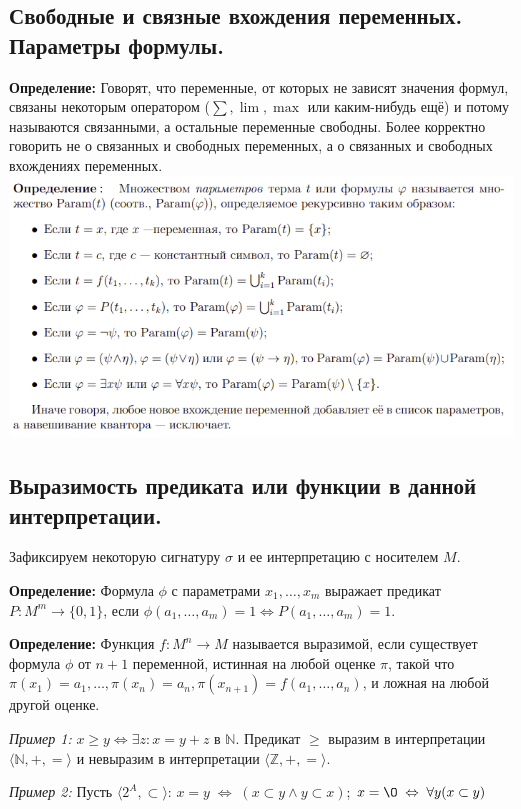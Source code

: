 \subsection{Свободные и связные вхождения переменных. Параметры формулы.}
\textbf{Определение:} Говорят, что переменные, от которых не зависят значения формул, связаны некоторым оператором ($\sum, \lim, \max$ или каким-нибудь ещё) и потому называются связанными, а остальные переменные свободны. Более корректно говорить не о связанных и свободных переменных, а о связанных и свободных вхождениях переменных.
\newline \includegraphics[width=0.9\linewidth]{images/1_definitions_param.png}

\subsection{Выразимость предиката или функции в данной интерпретации.}
Зафиксируем некоторую сигнатуру $\sigma$ и ее интерпретацию с носителем $M$.

\textbf{Определение:} Формула $\phi$ с параметрами $x_1,\ldots,x_m$ выражает предикат $P:M^m\to \{0,1\}$, если $\phi(a_1,\ldots,a_m)=1 \Leftrightarrow P(a_1,\ldots,a_m)=1$.

\textbf{Определение:} Функция $f : M^n \to M$ называется выразимой, если существует формула $\phi$ от $n+1$ переменной, истинная на любой оценке $\pi$, такой что $\pi(x_1) = a_1, \ldots , \pi(x_n) = a_n, \pi(x_{n+1}) = f(a_1,\ldots, a_n)$, и ложная на любой другой оценке.

\textit{Пример 1:} $x\geqslant y \Leftrightarrow \exists z: x=y+z$ в $\mathbb{N}$. Предикат $\geqslant$ выразим в интерпретации $\langle\mathbb{N},+,=\rangle$ и невыразим в интерпретации $\langle\mathbb{Z},+,=\rangle$.

\textit{Пример 2:} Пусть $\langle 2^A,\subset\rangle$: \;\; $x=y \; \Leftrightarrow \; (x\subset y \land y\subset x)$; \;\; $x=\O \; \Leftrightarrow \; \forall y (x\subset y)$

